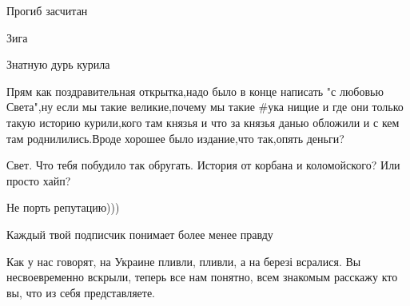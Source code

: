 \begin{itemize}
 
Прогиб засчитан

 
Зига

 
Знатную дурь курила

 

Прям как поздравительная открытка,надо было в конце написать "с любовью
Света",ну если мы такие великие,почему мы такие \#ука нищие и где они только
такую историю курили,кого там князья и что за князья данью обложили и с кем там
роднилились.Вроде хорошее было издание,что так,опять деньги?


 

Свет. Что тебя побудило так обругать. История от корбана и коломойского? Или
просто хайп?

Не порть репутацию)))

Каждый твой подписчик понимает более менее правду

 

Как у нас говорят, на Украине пливли, пливли, а на березі всралися. Вы
несвоевременно вскрыли, теперь все нам понятно, всем знакомым расскажу кто вы,
что из себя представляете.


\end{itemize}
